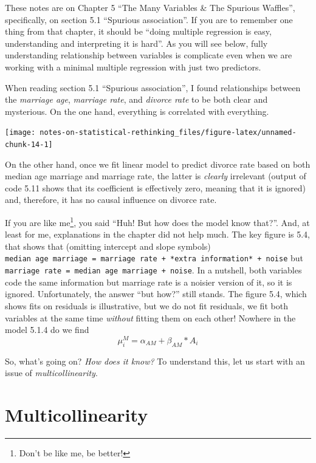 \documentclass[
]{book}
\begin{document}
These notes are on Chapter 5 ``The Many Variables \& The Spurious Waffles'', specifically, on section 5.1 ``Spurious association''. If you are to remember one thing from that chapter, it should be ``doing multiple regression is easy, understanding and interpreting it is hard''. As you will see below, fully understanding relationship between variables is complicate even when we are working with a minimal multiple regression with just two predictors.

When reading section 5.1 ``Spurious association'', I found relationships between the \emph{marriage age}, \emph{marriage rate}, and \emph{divorce rate} to be both clear and mysterious. On the one hand, everything is correlated with everything.

\begin{center}\texttt{[image: notes-on-statistical-rethinking\_files/figure-latex/unnamed-chunk-14-1]} \end{center}

On the other hand, once we fit linear model to predict divorce rate based on both median age marriage and marriage rate, the latter is \emph{clearly} irrelevant (output of code 5.11 shows that its coefficient is effectively zero, meaning that it is ignored) and, therefore, it has no causal influence on divorce rate.

If you are like me\footnote{Don't be like me, be better!}, you said ``Huh! But how does the model know that?''. And, at least for me, explanations in the chapter did not help much. The key figure is 5.4, that shows that (omitting intercept and slope symbols) \texttt{median\ age\ marriage\ =\ marriage\ rate\ +\ *extra\ information*\ +\ noise} but \texttt{marriage\ rate\ =\ median\ age\ marriage\ +\ noise}. In a nutshell, both variables code the same information but marriage rate is a noisier version of it, so it is ignored. Unfortunately, the answer ``but how?'' still stands. The figure 5.4, which shows fits on residuals is illustrative, but we do not fit residuals, we fit both variables at the same time \emph{without} fitting them on each other! Nowhere in the model 5.1.4 do we find \[\mu^{M}_{i} = \alpha_{AM} + \beta_{AM} * A_i\]

So, what's going on? \emph{How does it know?} To understand this, let us start with an issue of \emph{multicollinearity}.

\hypertarget{multicollinearity}{%
\section{Multicollinearity}\label{multicollinearity}}
\end{document}
